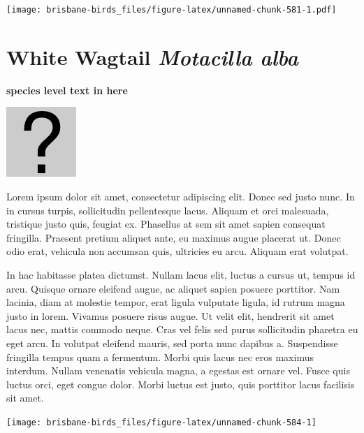 \documentclass[]{book}
\let\origfigure\figure
\let\endorigfigure\endfigure
\renewenvironment{figure}[1][2] {
  \expandafter\origfigure\expandafter[H]
} {
  \endorigfigure
}
\begin{document}
\begin{figure}
\centering
\texttt{[image: brisbane-birds\_files/figure-latex/unnamed-chunk-581-1.pdf]}
\caption{\label{fig:unnamed-chunk-581}insert figure caption}
\end{figure}

\section{\texorpdfstring{White Wagtail \emph{Motacilla
alba}}{White Wagtail Motacilla alba}}\label{white-wagtail-motacilla-alba}

\textbf{species level text in here}

\begin{figure}
\centering
\includegraphics{assets/missing.png}
\caption{No image for species}
\end{figure}

Lorem ipsum dolor sit amet, consectetur adipiscing elit. Donec sed justo
nunc. In in cursus turpis, sollicitudin pellentesque lacus. Aliquam et
orci malesuada, tristique justo quis, feugiat ex. Phasellus at sem sit
amet sapien consequat fringilla. Praesent pretium aliquet ante, eu
maximus augue placerat ut. Donec odio erat, vehicula non accumsan quis,
ultricies eu arcu. Aliquam erat volutpat.

In hac habitasse platea dictumst. Nullam lacus elit, luctus a cursus ut,
tempus id arcu. Quisque ornare eleifend augue, ac aliquet sapien posuere
porttitor. Nam lacinia, diam at molestie tempor, erat ligula vulputate
ligula, id rutrum magna justo in lorem. Vivamus posuere risus augue. Ut
velit elit, hendrerit sit amet lacus nec, mattis commodo neque. Cras vel
felis sed purus sollicitudin pharetra eu eget arcu. In volutpat eleifend
mauris, sed porta nunc dapibus a. Suspendisse fringilla tempus quam a
fermentum. Morbi quis lacus nec eros maximus interdum. Nullam venenatis
vehicula magna, a egestas est ornare vel. Fusce quis luctus orci, eget
congue dolor. Morbi luctus est justo, quis porttitor lacus facilisis sit
amet.

\begin{figure}
\texttt{[image: brisbane-birds\_files/figure-latex/unnamed-chunk-584-1]} \caption{insert figure caption}\label{fig:unnamed-chunk-584}
\end{figure}
\end{document}

